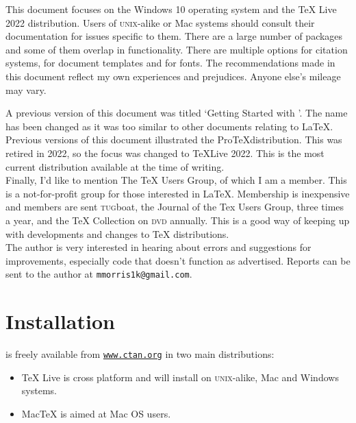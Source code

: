 \documentclass[12pt, a4paper]{article}
\begin{document}
This document focuses on the Windows 10 operating system and the TeX Live 2022 distribution. Users of \textsc{unix}-alike or Mac systems should consult their documentation for issues specific to them. There are a large number of packages and some of them overlap in functionality. There are multiple options for citation systems, for document templates and for fonts. The recommendations made in this document reflect my own experiences and prejudices. Anyone else's mileage may vary.

A previous version of this document was titled `Getting Started with \LaTeXe'. The name has been changed as it was too similar to other documents relating to LaTeX. Previous versions of this document illustrated the Pro\TeX distribution. This was retired in 2022, so the focus was changed to \TeX Live 2022. This is the most current distribution available at the time of writing. \\

Finally, I'd like to mention The TeX Users Group, of which I am a member. This is a not-for-profit group for those interested in LaTeX. Membership is inexpensive and members are sent \textsc{tug}boat, the Journal of the Tex Users Group, three times a year, and the TeX Collection on \textsc{dvd} annually. This is a good way of keeping up with developments and changes to TeX distributions. \\

The author is very interested in hearing about errors and suggestions for improvements, especially code that doesn't function as advertised. Reports can be sent to the author at \texttt{\color{Blue}mmorris1k@gmail.com}.  



\clearpage

\section{Installation}

\LaTeXe is freely available from \texttt{\url{www.ctan.org}} in two main distributions: 


\begin{itemize}
\item TeX Live is cross platform and will install on \textsc{unix}-alike, Mac and Windows systems.\\
	
\item MacTeX is aimed at Mac OS users.\\
	
\end{itemize}
\end{document}
